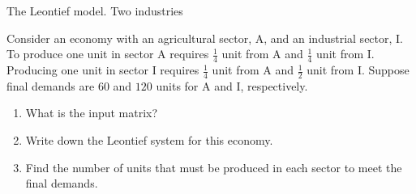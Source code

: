 \documentclass[9pt]{beamer}
\begin{document}


\begin{frame}{The Leontief model. Two industries}

Consider an economy with an agricultural sector, A, and an industrial sector, I. 
To produce one unit in sector A requires $\tfrac{1}{4}$ unit from A and $\tfrac{1}{4}$ unit from I. 
Producing one unit in sector I requires $\tfrac{1}{4}$ unit from A and $\tfrac{1}{2}$ unit from I. 
Suppose final demands are $60$ and $120$ units for A and I, respectively.

\begin{enumerate}[leftmargin = 0.5cm, label = (\alph*), rightmargin = 0.2cm]
    \item What is the input matrix?
    \item Write down the Leontief system for this economy.
    \item Find the number of units that must be produced in each sector to meet the final demands.
\end{enumerate}

\end{frame}
\end{document}
